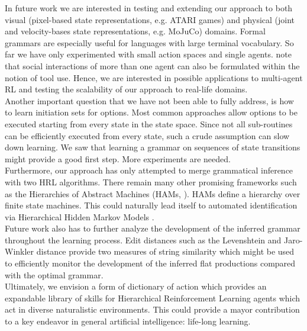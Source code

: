\documentclass[colorinlistoftodos]{article}
\theoremstyle{definition}
\begin{document}
In future work we are interested in testing and extending our approach to both visual (pixel-based state representations, e.g. ATARI games) and physical (joint and velocity-bases state representations, e.g. MoJuCo) domains. Formal grammars are especially useful for languages with large terminal vocabulary. So far we have only experimented with small action spaces and single agents. \citet{Pastra_2012} note that social interactions of more than one agent can also be formulated within the notion of tool use. Hence, we are interested in possible applications to multi-agent RL  and testing the scalability of our approach to real-life domains. \\
Another important question that we have not been able to fully address, is how to  learn initiation sets for options. Most common approaches allow options to be executed starting from every state in the state space. Since not all sub-routines can be efficiently executed from every state, such a crude assumption can slow down learning. We saw that learning a grammar on sequences of state transitions might provide a good first step. More experiments are needed.\\ 
Furthermore, our approach has only attempted to merge grammatical inference with two HRL algorithms. There remain many other promising frameworks such as the Hierarchies of Abstract Machines (HAMs, \citet{Parr_1998a,Parr_1998b}). HAMs define a hierarchy over finite state machines. This could naturally lead itself to automated identification via Hierarchical Hidden Markov Models \citep{Fine_1998}. \\
Future work also has to further analyze the development of the inferred grammar throughout the learning process. Edit distances such as the Levenshtein and Jaro-Winkler distance provide two measures of string similarity which might be used to efficiently monitor the development of the inferred flat productions compared with the optimal grammar. \\
Ultimately, we envision a form of dictionary of action which provides an expandable library of skills for Hierarchical Reinforcement Learning agents which act in diverse naturalistic environments. This could provide a mayor contribution to a key endeavor in general artificial intelligence: life-long learning.

\newpage
\listoftodos

\setlength{\bibsep}{4pt plus 0.3ex}
\end{document}
